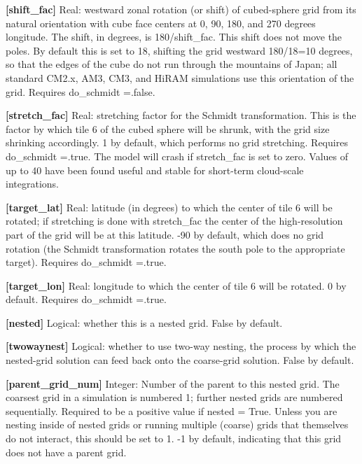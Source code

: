 {\bfseries \mbox{[}shift\+\_\+fac\mbox{]}} Real\+: westward zonal rotation (or shift) of cubed-\/sphere grid from its natural orientation with cube face centers at 0, 90, 180, and 270 degrees longitude. The shift, in degrees, is 180/shift\+\_\+fac. This shift does not move the poles. By default this is set to 18, shifting the grid westward 180/18=10 degrees, so that the edges of the cube do not run through the mountains of Japan; all standard C\+M2.\+x, A\+M3, C\+M3, and Hi\+R\+AM simulations use this orientation of the grid. Requires do\+\_\+schmidt =.false.

{\bfseries \mbox{[}stretch\+\_\+fac\mbox{]}} Real\+: stretching factor for the Schmidt transformation. This is the factor by which tile 6 of the cubed sphere will be shrunk, with the grid size shrinking accordingly. 1 by default, which performs no grid stretching. Requires do\+\_\+schmidt =.true. The model will crash if stretch\+\_\+fac is set to zero. Values of up to 40 have been found useful and stable for short-\/term cloud-\/scale integrations.

{\bfseries \mbox{[}target\+\_\+lat\mbox{]}} Real\+: latitude (in degrees) to which the center of tile 6 will be rotated; if stretching is done with stretch\+\_\+fac the center of the high-\/resolution part of the grid will be at this latitude. -\/90 by default, which does no grid rotation (the Schmidt transformation rotates the south pole to the appropriate target). Requires do\+\_\+schmidt =.true.

{\bfseries \mbox{[}target\+\_\+lon\mbox{]}} Real\+: longitude to which the center of tile 6 will be rotated. 0 by default. Requires do\+\_\+schmidt =.true.

{\bfseries \mbox{[}nested\mbox{]}} Logical\+: whether this is a nested grid. False by default.

{\bfseries \mbox{[}twowaynest\mbox{]}} Logical\+: whether to use two-\/way nesting, the process by which the nested-\/grid solution can feed back onto the coarse-\/grid solution. False by default.

{\bfseries \mbox{[}parent\+\_\+grid\+\_\+num\mbox{]}} Integer\+: Number of the parent to this nested grid. The coarsest grid in a simulation is numbered 1; further nested grids are numbered sequentially. Required to be a positive value if nested = True. Unless you are nesting inside of nested grids or running multiple (coarse) grids that themselves do not interact, this should be set to 1. -\/1 by default, indicating that this grid does not have a parent grid.

